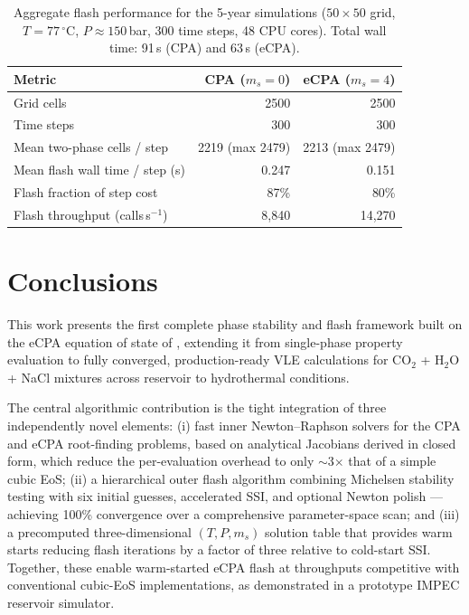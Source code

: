 \documentclass[preprint,12pt,authoryear]{elsarticle}
\begin{document}
\begin{table}[H]
  \centering
  \caption{Aggregate flash performance for the 5-year simulations
           ($50\times50$ grid, $T = 77\,^\circ$C, $P \approx 150$\,bar, 300 time steps,
           48 CPU cores). Total wall time: 91\,s (CPA) and 63\,s (eCPA).}
  \label{tab:sim_perf}
  \begin{tabular}{lrr}
    \toprule
    Metric & CPA ($m_s = 0$) & eCPA ($m_s = 4$) \\
    \midrule
    Grid cells                          & 2500       & 2500       \\
    Time steps                          & 300        & 300        \\
    Mean two-phase cells / step         & 2219 (max 2479) & 2213 (max 2479) \\
    Mean flash wall time / step (s)     & 0.247      & 0.151      \\
    Flash fraction of step cost         & 87\%       & 80\%       \\
    Flash throughput (calls\,s$^{-1}$)  & 8{,}840    & 14{,}270   \\
    \bottomrule
  \end{tabular}
\end{table}


\section{Conclusions}
\label{sec:conclusions}

This work presents the first complete phase stability and flash framework built on the
eCPA equation of state of \citet{Coelho2025}, extending it from single-phase property
evaluation to fully converged, production-ready VLE calculations for CO$_2$ + H$_2$O +
NaCl mixtures across reservoir to hydrothermal conditions.

The central algorithmic contribution is the tight integration of three independently
novel elements: (i) fast inner Newton--Raphson solvers for the CPA and eCPA root-finding
problems, based on analytical Jacobians derived in closed form, which reduce the
per-evaluation overhead to only $\sim$3$\times$ that of a simple cubic EoS; (ii) a
hierarchical outer flash algorithm combining Michelsen stability testing with six initial
guesses, accelerated SSI, and optional Newton polish — achieving 100\% convergence over
a comprehensive parameter-space scan; and (iii) a precomputed three-dimensional
$(T, P, m_s)$ solution table that provides warm starts reducing flash iterations by a
factor of three relative to cold-start SSI.
Together, these enable warm-started eCPA flash at throughputs competitive with
conventional cubic-EoS implementations, as demonstrated in a prototype IMPEC reservoir
simulator.
\end{document}
